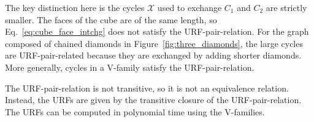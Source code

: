 \documentclass[fleqn,11pt]{article}
\newcommand\calX{\mathcal{X}}     %
\begin{document}
The key distinction here is the cycles $\calX$ used to exchange $C_1$ and $C_2$ are strictly smaller. The faces of the cube are of the same length, so Eq.~\eqref{eq:cube_face_intchg} does not satisfy the URF-pair-relation. 
For the graph composed of chained diamonds in Figure~\ref{fig:three_diamonds}, the large cycles are URF-pair-related because they are exchanged by adding shorter diamonds. More generally, cycles in a V-family satisfy the URF-pair-relation. 


The URF-pair-relation is not transitive, so it is not an equivalence relation. Instead, the URFs are given by the transitive closure of the URF-pair-relation. 
{The URFs can be computed in polynomial time using the V-families.~\cite{kolodzikUnique2012}}
%
%



\end{document}
